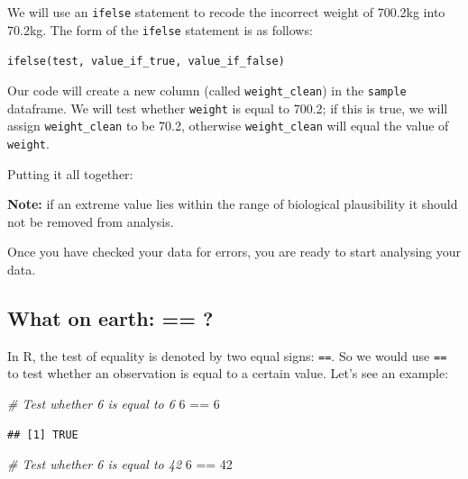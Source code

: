 \documentclass[
]{memoir}
\newenvironment{Shaded}{\begin{snugshade}}{\end{snugshade}}
\newcommand{\CommentTok}[1]{\textcolor[rgb]{0.56,0.35,0.01}{\textit{#1}}}
\newcommand{\DecValTok}[1]{\textcolor[rgb]{0.00,0.00,0.81}{#1}}
\newcommand{\FloatTok}[1]{\textcolor[rgb]{0.00,0.00,0.81}{#1}}
\newcommand{\FunctionTok}[1]{\textcolor[rgb]{0.00,0.00,0.00}{#1}}
\newcommand{\NormalTok}[1]{#1}
\newcommand{\OtherTok}[1]{\textcolor[rgb]{0.56,0.35,0.01}{#1}}
\newcommand{\SpecialCharTok}[1]{\textcolor[rgb]{0.00,0.00,0.00}{#1}}
\begin{document}
We will use an \texttt{ifelse} statement to recode the incorrect weight of 700.2kg into 70.2kg. The form of the \texttt{ifelse} statement is as follows:

\texttt{ifelse(test,\ value\_if\_true,\ value\_if\_false)}

Our code will create a new column (called \texttt{weight\_clean}) in the \texttt{sample} dataframe. We will test whether \texttt{weight} is equal to 700.2; if this is true, we will assign \texttt{weight\_clean} to be 70.2, otherwise \texttt{weight\_clean} will equal the value of \texttt{weight}.

Putting it all together:

\begin{Shaded}
\end{Shaded}

\textbf{Note:} if an extreme value lies within the range of biological plausibility it should not be removed from analysis.

Once you have checked your data for errors, you are ready to start analysing your data.

\hypertarget{what-on-earth}{%
\subsection{What on earth: == ?}\label{what-on-earth}}

In R, the test of equality is denoted by two equal signs: \texttt{==}. So we would use \texttt{==} to test whether an observation is equal to a certain value. Let's see an example:

\begin{Shaded}
\begin{Highlighting}[]
\CommentTok{\# Test whether 6 is equal to 6}
\DecValTok{6} \SpecialCharTok{==} \DecValTok{6}
\end{Highlighting}
\end{Shaded}

\begin{verbatim}
## [1] TRUE
\end{verbatim}

\begin{Shaded}
\begin{Highlighting}[]
\CommentTok{\# Test whether 6 is equal to 42}
\DecValTok{6} \SpecialCharTok{==} \DecValTok{42}
\end{Highlighting}
\end{Shaded}
\end{document}
